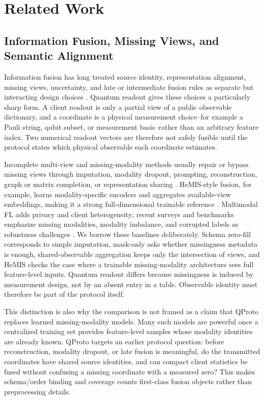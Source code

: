 \section{Related Work}

\subsection{Information Fusion, Missing Views, and Semantic Alignment}

Information fusion has long treated source identity, representation alignment, missing views, uncertainty, and late or intermediate fusion rules as separate but interacting design choices \cite{castanedo2013datafusion,lahat2015multimodal,baltrusaitis2019multimodal,zhao2017multiview}. Quantum readout gives these choices a particularly sharp form. A client readout is only a partial view of a public observable dictionary, and a coordinate is a physical measurement choice--for example a Pauli string, qubit subset, or measurement basis--rather than an arbitrary feature index. Two numerical readout vectors are therefore not safely fusible until the protocol states which physical observable each coordinate estimates.

Incomplete multi-view and missing-modality methods usually repair or bypass missing views through imputation, modality dropout, prompting, reconstruction, graph or matrix completion, or representation sharing \cite{havaei2016hemis,tang2024incomplete,cai2024projected,wu2024missingmodality}. HeMIS-style fusion, for example, learns modality-specific encoders and aggregates available-view embeddings, making it a strong full-dimensional trainable reference \cite{havaei2016hemis}. Multimodal FL adds privacy and client heterogeneity; recent surveys and benchmarks emphasize missing modalities, modality imbalance, and corrupted labels as robustness challenges \cite{lin2023federatedmultimodal,che2023multimodalsurvey,feng2023fedmultimodal,yu2024fedinmm}. We borrow these baselines deliberately. Schema zero-fill corresponds to simple imputation, mask-only asks whether missingness metadata is enough, shared-observable aggregation keeps only the intersection of views, and HeMIS checks the case where a trainable missing-modality architecture sees full feature-level inputs. Quantum readout differs because missingness is induced by measurement design, not by an absent entry in a table. Observable identity must therefore be part of the protocol itself.

This distinction is also why the comparison is not framed as a claim that QProto replaces learned missing-modality models. Many such models are powerful once a centralized training set provides feature-level samples whose modality identities are already known. QProto targets an earlier protocol question: before reconstruction, modality dropout, or late fusion is meaningful, do the transmitted coordinates have shared source identities, and can compact client statistics be fused without confusing a missing coordinate with a measured zero? This makes schema/order binding and coverage counts first-class fusion objects rather than preprocessing details.

